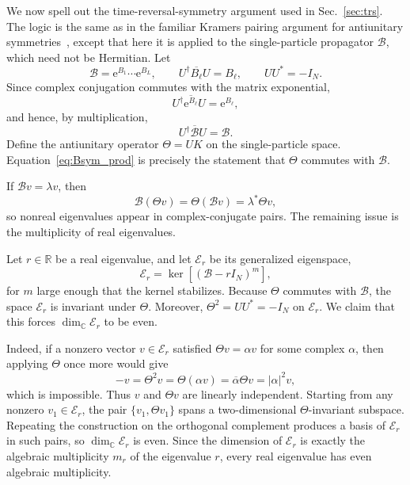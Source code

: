\documentclass[twocolumn,aps,prb,10pt,amsmath,amssymb,amsthm,superscriptaddress]{revtex4-2}
\newcommand{\ee}{\mathrm{e}}
\newcommand{\hc}{\dagger}
\newcommand{\mc}[1]{\mathcal{#1}}
\theoremstyle{remark}
\begin{document}
We now spell out the time-reversal-symmetry argument used in Sec.~\ref{sec:trs}. The logic is the same as in the familiar Kramers pairing argument for antiunitary symmetries~\cite{sakurai2017modern}, except that here it is applied to the single-particle propagator $\mc B$, which need not be Hermitian. Let
\begin{equation}
    \mc B = \ee^{B_1}\cdots\ee^{B_L},
    \qquad
    U^\hc\overline{B_\ell}U = B_\ell,
    \qquad
    UU^*=-I_N.
\end{equation}
Since complex conjugation commutes with the matrix exponential,
\begin{equation}
    U^\hc\overline{\ee^{B_\ell}}U = \ee^{B_\ell},
\end{equation}
and hence, by multiplication,
\begin{equation}
    U^\hc\overline{\mc B}U = \mc B.
    \label{eq:Bsym_prod}
\end{equation}
Define the antiunitary operator $\Theta=UK$ on the single-particle space. Equation~\eqref{eq:Bsym_prod} is precisely the statement that $\Theta$ commutes with $\mc B$.

If $\mc Bv=\lambda v$, then
\begin{equation}
    \mc B(\Theta v)=\Theta(\mc Bv)=\lambda^*\Theta v,
\end{equation}
so nonreal eigenvalues appear in complex-conjugate pairs. The remaining issue is the multiplicity of real eigenvalues.

Let $r\in\mathbb R$ be a real eigenvalue, and let $\mc E_r$ be its generalized eigenspace,
\begin{equation}
    \mc E_r = \ker\left[(\mc B-rI_N)^m\right],
\end{equation}
for $m$ large enough that the kernel stabilizes. Because $\Theta$ commutes with $\mc B$, the space $\mc E_r$ is invariant under $\Theta$. Moreover, $\Theta^2=UU^*=-I_N$ on $\mc E_r$. We claim that this forces $\dim_\mathbb C \mc E_r$ to be even.

Indeed, if a nonzero vector $v\in\mc E_r$ satisfied $\Theta v = \alpha v$ for some complex $\alpha$, then applying $\Theta$ once more would give
\begin{equation}
    -v = \Theta^2 v = \Theta(\alpha v) = \overline{\alpha}\Theta v = |\alpha|^2 v,
\end{equation}
which is impossible. Thus $v$ and $\Theta v$ are linearly independent. Starting from any nonzero $v_1\in\mc E_r$, the pair $\{v_1,\Theta v_1\}$ spans a two-dimensional $\Theta$-invariant subspace. Repeating the construction on the orthogonal complement produces a basis of $\mc E_r$ in such pairs, so $\dim_\mathbb C\mc E_r$ is even. Since the dimension of $\mc E_r$ is exactly the algebraic multiplicity $m_r$ of the eigenvalue $r$, every real eigenvalue has even algebraic multiplicity.
\end{document}
